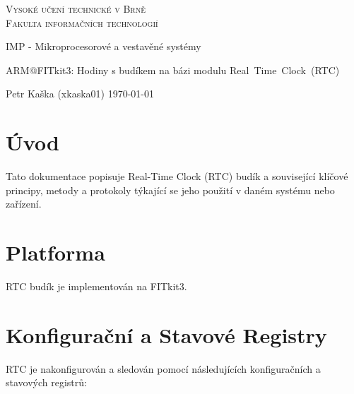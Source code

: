 \documentclass[a4paper, 11pt]{article}
\begin{document}
 
    \begin{titlepage}
        
        \begin{center}
        
            {\Huge\textsc{ Vysoké učení technické v Brně\\
            \huge Fakulta informačních technologií}\\}
            
             
             {\LARGE \Huge{IMP - Mikroprocesorové a vestavěné systémy\\ }}
             
                \vspace{0.5cm}
                
             {\LARGE ARM@FITkit3: Hodiny s budíkem na bázi modulu Real~Time~Clock~(RTC)}
            
           \end{center} 
            
            {\LARGE Petr Kaška (xkaska01) \hfill \today}

    \end{titlepage}


    \section{Úvod}
    Tato dokumentace popisuje Real-Time Clock (RTC) budík a související klíčové principy, metody a protokoly týkající se jeho použití v daném systému nebo zařízení.

    \section*{Platforma}
    RTC budík je implementován na FITkit3.

    \section*{Konfigurační a Stavové Registry}
    RTC je nakonfigurován a sledován pomocí následujících konfiguračních a stavových registrů:
\end{document}
